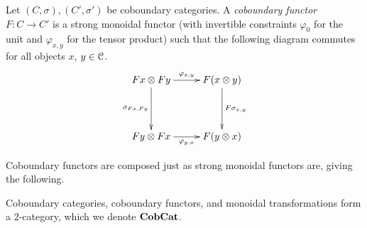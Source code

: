 \begin{Defi}
Let $(C,\sigma), (C', \sigma')$ be coboundary categories. A \emph{coboundary functor} $F \colon C \rightarrow C'$ is a strong monoidal functor (with invertible constraints $\varphi_{0}$ for the unit and $\varphi_{x,y}$ for the tensor product) such that the following diagram commutes for all objects $x$, $y \in \mathcal{C}$.
  \[
    \xy
      (0,0)*+{Fx \otimes Fy}="00";
      (25,0)*+{F(x \otimes y)}="10";
      (0,-20)*+{Fy \otimes Fx}="01";
      (25,-20)*+{F(y \otimes x)}="11";
      {\ar^{\varphi_{x,y}} "00";"10"};
      {\ar^{F\sigma_{x,y}} "10";"11"};
      {\ar_{\sigma_{Fx,Fy}} "00";"01"};
      {\ar_{\varphi_{y,x}} "01";"11"};
    \endxy
  \]
\end{Defi}

Coboundary functors are composed just as strong monoidal functors are, giving the following.

\begin{lem}
Coboundary categories, coboundary functors, and monoidal transformations form a $2$-category, which we denote $\mathbf{CobCat}$.
\end{lem}


